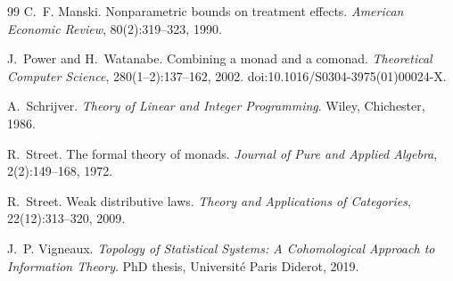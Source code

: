 \documentclass[11pt]{article}
\theoremstyle{definition}
\theoremstyle{remark}
\begin{document}
\begin{thebibliography}{99}
C.~F. Manski.
\newblock Nonparametric bounds on treatment effects.
\newblock \emph{American Economic Review}, 80(2):319--323, 1990.

J.~Power and H.~Watanabe.
\newblock Combining a monad and a comonad.
\newblock \emph{Theoretical Computer Science}, 280(1--2):137--162, 2002.
\newblock doi:10.1016/S0304-3975(01)00024-X.

A.~Schrijver.
\newblock \emph{Theory of Linear and Integer Programming}.
\newblock Wiley, Chichester, 1986.

R.~Street.
\newblock The formal theory of monads.
\newblock \emph{Journal of Pure and Applied Algebra}, 2(2):149--168, 1972.

R.~Street.
\newblock Weak distributive laws.
\newblock \emph{Theory and Applications of Categories}, 22(12):313--320, 2009.

J.~P. Vigneaux.
\newblock \emph{Topology of Statistical Systems: A Cohomological Approach to Information Theory}.
\newblock PhD thesis, Universit\'e Paris Diderot, 2019.

\end{thebibliography}
\end{document}
